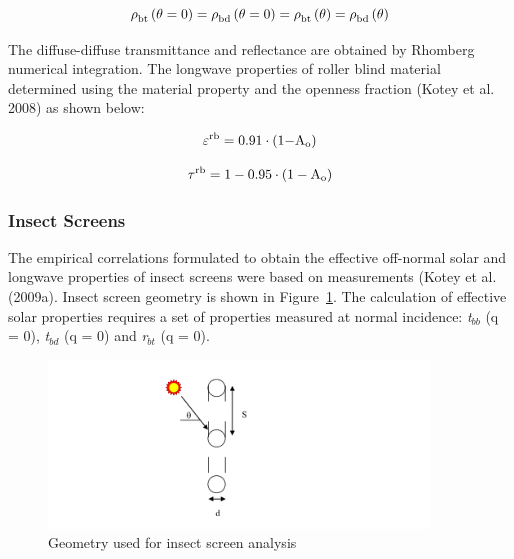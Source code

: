 \begin{equation}
{\rm{\rho }}_{{\rm{bt}}}^{}\left( {{\rm{\theta }} = {\rm{0}}} \right) = {\rm{\rho }}_{{\rm{bd}}}^{}\left( {{\rm{\theta }} = {\rm{0}}} \right) = {\rm{\rho }}_{{\rm{bt}}}^{}\left( {\rm{\theta }} \right) = {\rm{\rho }}_{{\rm{bd}}}^{}\left( {\rm{\theta }} \right)
\end{equation}

The diffuse-diffuse transmittance and reflectance are obtained by Rhomberg numerical integration. The longwave properties of roller blind material determined using the material property and the openness fraction (Kotey et al. 2008) as shown below:

\begin{equation}
{\varepsilon ^{{\rm{rb}}}} = {\rm{0}}{\rm{.91}} \cdot \left( {{\rm{1 - }}{{\rm{A}}_{\rm{o}}}} \right)
\end{equation}

\begin{equation}
{\tau ^{{\rm{rb}}}} = {\rm{1}} - {\rm{0}}{\rm{.95}} \cdot \left( {{\rm{1}} - {{\rm{A}}_{\rm{o}}}} \right)
\end{equation}

\subsubsection{Insect Screens}\label{insect-screens}

The empirical correlations formulated to obtain the effective off-normal solar and longwave properties of insect screens were based on measurements (Kotey et al. (2009a). Insect screen geometry is shown in Figure~\ref{fig:geometry-used-for-insect-screen-analysis}. The calculation of effective solar properties requires a set of properties measured at normal incidence: \emph{t}\(_{bb}\) (q = 0), \emph{t}\(_{bd}\) (q = 0) and \emph{r}\(_{bt}\) (q = 0).

\begin{figure}[hbtp] %
\centering
\includegraphics[width=0.9\textwidth, height=0.9\textheight, keepaspectratio=true]{media/image1857.svg.png}
\caption{Geometry used for insect screen analysis \protect \label{fig:geometry-used-for-insect-screen-analysis}}
\end{figure}

